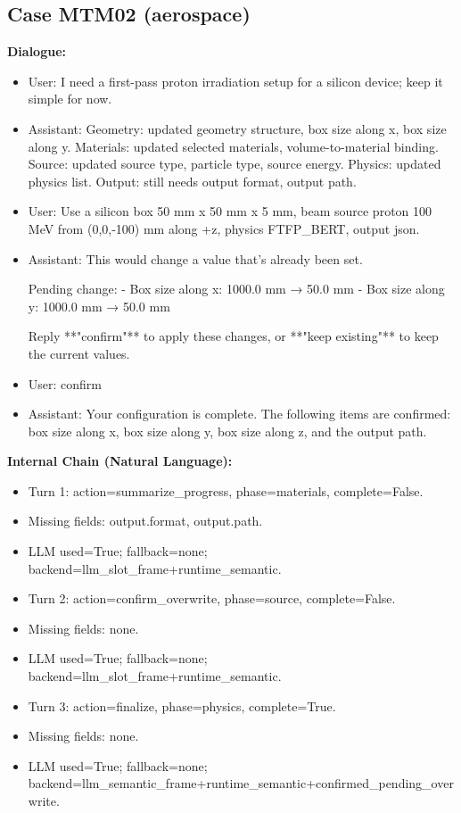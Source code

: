 \documentclass[11pt]{ctexart}
\begin{document}
\subsection{Case MTM02 (aerospace)}
\textbf{Dialogue:}
\begin{itemize}
\item User: I need a first-pass proton irradiation setup for a silicon device; keep it simple for now.
\item Assistant: Geometry: updated geometry structure, box size along x, box size along y. Materials: updated selected materials, volume-to-material binding. Source: updated source type, particle type, source energy. Physics: updated physics list. Output: still needs output format, output path.
\item User: Use a silicon box 50 mm x 50 mm x 5 mm, beam source proton 100 MeV from (0,0,-100) mm along +z, physics FTFP\_BERT, output json.
\item Assistant: This would change a value that's already been set.

Pending change:
- Box size along x: 1000.0 mm → 50.0 mm
- Box size along y: 1000.0 mm → 50.0 mm

Reply **"confirm"** to apply these changes, or **"keep existing"** to keep the current values.
\item User: confirm
\item Assistant: Your configuration is complete. The following items are confirmed: box size along x, box size along y, box size along z, and the output path.
\end{itemize}
\textbf{Internal Chain (Natural Language):}
\begin{itemize}
\item Turn 1: action=summarize\_progress, phase=materials, complete=False.
\item Missing fields: output.format, output.path.
\item LLM used=True; fallback=none; backend=llm\_slot\_frame+runtime\_semantic.
\item Turn 2: action=confirm\_overwrite, phase=source, complete=False.
\item Missing fields: none.
\item LLM used=True; fallback=none; backend=llm\_slot\_frame+runtime\_semantic.
\item Turn 3: action=finalize, phase=physics, complete=True.
\item Missing fields: none.
\item LLM used=True; fallback=none; backend=llm\_semantic\_frame+runtime\_semantic+confirmed\_pending\_overwrite.
\end{itemize}
\end{document}

